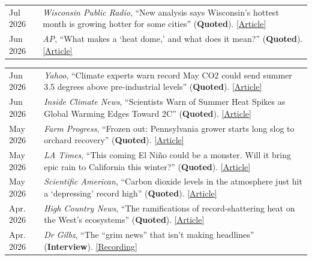 \documentclass[margin,line,palatino,courier,10pt]{res}
\begin{document}
\begin{resume}
\begin{tabular}{@{}p{0.9in}p{4in}}
Jul 2026 & \textit{Wisconsin Public Radio}, ``New analysis says Wisconsin’s hottest month is growing hotter for some cities'' (\textbf{Quoted}). \href{https://www.wpr.org/news/new-analysis-says-wisconsins-hottest-month-is-growing-hotter-for-some-cities}{[Article]}\\
Jun 2026 & \textit{AP}, ``What makes a ‘heat dome,’ and what does it mean?'' (\textbf{Quoted}). \href{https://apnews.com/article/climate-heat-dome-temperatures-baa416ddc73ce7e5b902bcf6686f0ff0}{[Article]}\\
\end{tabular}
\begin{tabular}{@{}p{0.9in}p{4in}}
Jun 2026 & \textit{Yahoo}, ``Climate experts warn record May CO2 could send summer 3.5 degrees above pre-industrial levels'' (\textbf{Quoted}). \href{https://www.yahoo.com/news/science/articles/climate-experts-warn-record-may-042000046.html}{[Article]}\\
Jun 2026 & \textit{Inside Climate News}, ``Scientists Warn of Summer Heat Spikes as Global Warming Edges Toward 2C'' (\textbf{Quoted}). \href{https://insideclimatenews.org/news/17062026/summer-heat-spike-as-global-warming-surges/}{[Article]}\\
May 2026 & \textit{Farm Progress}, ``Frozen out: Pennsylvania grower starts long slog to orchard recovery'' (\textbf{Quoted}). \href{https://www.farmprogress.com/orchard-crops/frozen-out-pennsylvania-grower-starts-long-slog-to-orchard-recovery}{[Article]}\\
May 2026 & \textit{LA Times}, ``This coming El Ni\~{n}o could be a monster. Will it bring epic rain to California this winter?'' (\textbf{Quoted}). \href{https://www.latimes.com/california/story/2026-05-14/el-nino-could-be-monster-what-would-it-mean-for-california}{[Article]}\\
May 2026 & \textit{Scientific American}, ``Carbon dioxide levels in the atmosphere just hit a `depressing' record high'' (\textbf{Quoted}). \href{https://www.scientificamerican.com/article/carbon-dioxide-levels-in-the-atmosphere-just-hit-a-depressing-record-high/}{[Article]}\\
Apr. 2026 & \textit{High Country News}, ``The ramifications of record-shattering heat on the West’s ecosystems'' (\textbf{Quoted}). \href{https://www.hcn.org/articles/the-ramifications-of-record-shattering-heat-on-the-wests-ecosystems/}{[Article]}\\
Apr. 2026 & \textit{Dr Gilbz}, ``The ``grim news'' that isn’t making headlines'' (\textbf{Interview}). \href{https://www.youtube.com/watch?v=GiWZNJHspnQ}{[Recording]}\\

\end{tabular}
\end{resume}
\end{document}
